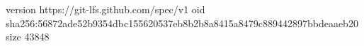version https://git-lfs.github.com/spec/v1
oid sha256:56872ade52b9354dbc155620537eb8b2b8a8415a8479c889442897bbdeaaeb20
size 43848
